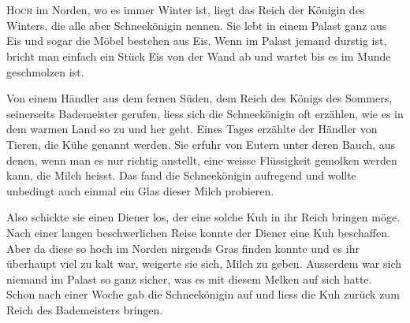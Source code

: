 \chapter*{}
\lettrine[lines=3]{\color{red}H}{och} im Norden, wo es immer Winter ist, liegt das Reich der Königin des Winters, die alle aber Schneekönigin nennen. Sie lebt in einem Palast ganz aus Eis und sogar die Möbel bestehen aus Eis. Wenn im Palast jemand durstig ist, bricht man einfach ein Stück Eis von der Wand ab und wartet bis es im Munde geschmolzen ist.

Von einem Händler aus dem fernen Süden, dem Reich des Königs des Sommers, seinerseits Bademeister gerufen, liess sich die Schneekönigin oft erzählen, wie es in dem warmen Land so zu und her geht.  Eines Tages erzählte der Händler von Tieren, die Kühe genannt werden. Sie erfuhr von Eutern unter deren Bauch, aus denen, wenn man es nur richtig anstellt, eine weisse Flüssigkeit gemolken werden kann, die Milch heisst. Das fand die Schneekönigin aufregend und wollte unbedingt auch einmal ein Glas dieser Milch probieren.

Also schickte sie einen Diener los, der eine solche Kuh in ihr Reich bringen möge. Nach einer langen beschwerlichen Reise konnte der Diener eine Kuh beschaffen. Aber da diese so hoch im Norden nirgends Gras finden konnte und es ihr überhaupt viel zu kalt war, weigerte sie sich, Milch zu geben. Ausserdem war sich niemand im Palast so ganz sicher, was es mit diesem Melken auf sich hatte. Schon nach einer Woche gab die Schneekönigin auf und liess die Kuh zurück zum Reich des Bademeisters bringen.

